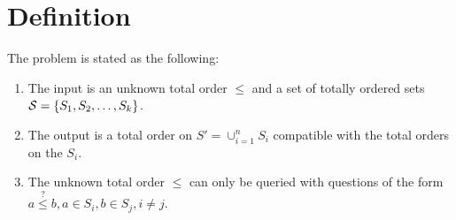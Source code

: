 \section{Definition}
\label{tree:merging:def}

The problem is stated as the following:

\begin{enumerate}
\item The input is an unknown total order $\le$ and a set of totally ordered sets ${\cal S} = \{S_1, S_2, \dots, S_k\}$.
\item The output is a total order on $S' = \cup_{i=1}^{n} S_i$ compatible with the total orders on the $S_i$.
\item The unknown total order $\le$ can only be queried with questions of the form $a \stackrel{?}{\le} b, a \in S_i, b \in S_j, i \neq j$.
\end{enumerate}

